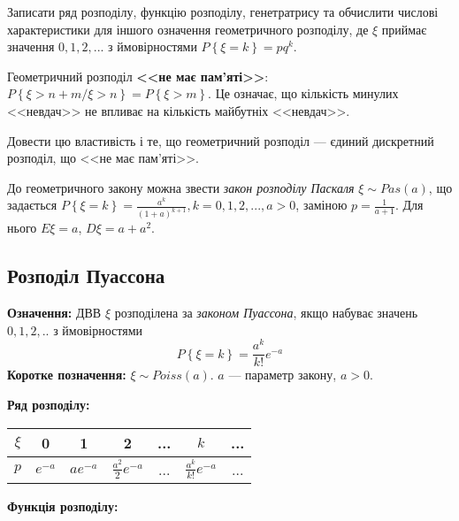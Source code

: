 \begin{exercise}
    Записати ряд розподілу, функцію розподілу, генетратрису та обчислити
    числові характеристики для іншого означення геометричного розподілу, 
    де $\xi$ приймає значення $0,1,2,...$ з ймовірностями $P\left\{\xi = k\right\} = pq^k$.
\end{exercise}
Геометричний розподіл \textbf{<<не має пам'яті>>}: $P\left\{\xi>n+m / \xi>n\right\} = P\left\{\xi>m\right\}$.
Це означає, що кількість минулих <<невдач>> не впливає на кількість майбутніх <<невдач>>.
\begin{exercise}
    Довести цю властивість і те, що геометричний розподіл --- 
    єдиний дискретний розподіл, що <<не має пам'яті>>.
\end{exercise}
До геометричного закону можна звести \emph{закон розподілу Паскаля} $\xi \sim {Pas}(a)$,
що задається $P\left\{\xi = k\right\} = \frac{a^k}{(1+a)^{k+1}}, k = 0,1,2,..., a>0$,
заміною $p=\frac{1}{a+1}$. Для нього $E\xi = a$, $D\xi = a + a^2$.

\subsection{Розподіл Пуассона}
\noindent\textbf{Означення:}
    ДВВ $\xi$ розподілена за \emph{законом Пуассона}, 
    якщо набуває значень $0,1,2,..$ з ймовірностями \begin{equation}
        P\left\{\xi = k\right\} = \frac{a^k}{k!}e^{-a}
    \end{equation}
    \textbf{Коротке позначення:} $\xi \sim {Poiss}(a)$.
    $a$ --- параметр закону, $a > 0$.

\noindent\textbf{Ряд розподілу:}

\begin{tabular}{c|c|c|c|c|c|c}
    $\xi$ & 0 & 1 & 2 & ... & $k$ & ... \\
    \hline
    $p$ & $e^{-a}$ & $ae^{-a}$ & $\frac{a^2}{2}e^{-a}$ & ... & $\frac{a^k}{k!}e^{-a}$ & ...
\end{tabular}

\noindent\textbf{Функція розподілу:}

